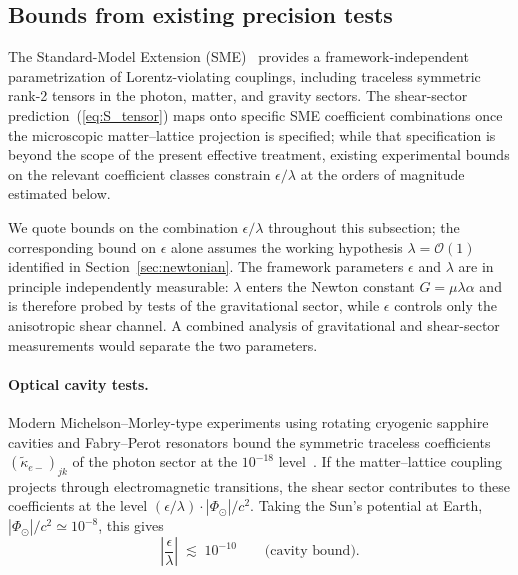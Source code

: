 \documentclass[a4paper,fleqn]{cas-dc}
\theoremstyle{thmstyleone}%
\theoremstyle{thmstyletwo}%
\begin{document}
\subsection{Bounds from existing precision tests}
\label{sec:bounds}

The Standard-Model Extension (SME)~\cite{ColladayKostelecky1998,
Kostelecky2004} provides a framework-independent parametrization
of Lorentz-violating couplings, including traceless symmetric
rank-2 tensors in the photon, matter, and gravity sectors.
The shear-sector prediction~(\ref{eq:S_tensor}) maps onto
specific SME coefficient combinations once the microscopic
matter--lattice projection is specified; while that
specification is beyond the scope of the present effective
treatment, existing experimental bounds on the relevant
coefficient classes constrain $\epsilon/\lambda$ at the orders
of magnitude estimated below.

We quote bounds on the combination $\epsilon/\lambda$
throughout this subsection; the corresponding bound on
$\epsilon$ alone assumes the working hypothesis
$\lambda=\mathcal{O}(1)$ identified in
Section~\ref{sec:newtonian}. The framework parameters
$\epsilon$ and $\lambda$ are in principle independently
measurable: $\lambda$ enters the Newton constant
$G=\mu\lambda\alpha$ and is therefore probed by tests of the
gravitational sector, while $\epsilon$ controls only the
anisotropic shear channel. A combined analysis of
gravitational and shear-sector measurements would separate the
two parameters.

\paragraph{Optical cavity tests.}
Modern Michelson--Morley-type experiments using rotating
cryogenic sapphire cavities and Fabry--Perot resonators bound
the symmetric traceless coefficients
$(\tilde{\kappa}_{e-})_{jk}$ of the photon sector at the
$10^{-18}$ level~\cite{Nagel2015}. If the matter--lattice
coupling projects through electromagnetic transitions, the
shear sector contributes to these coefficients at the level
$(\epsilon/\lambda)\cdot|\Phi_{\odot}|/c^2$. Taking the Sun's
potential at Earth, $|\Phi_{\odot}|/c^2\simeq 10^{-8}$, this
gives
\begin{equation}
    \left|\frac{\epsilon}{\lambda}\right|
    \;\lesssim\;10^{-10}
    \qquad\text{(cavity bound)}.
    \label{eq:bound_cavity}
\end{equation}
\end{document}
